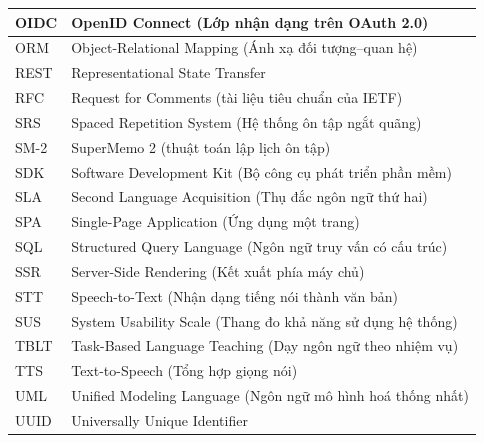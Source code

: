 \documentclass[12pt,a4paper,oneside]{report}
\begin{document}
\begin{table}[h]
\begin{tabular}{|l|l|}
    \hline
    OIDC  & OpenID Connect (Lớp nhận dạng trên OAuth 2.0) \\
    \hline
    ORM   & Object-Relational Mapping (Ánh xạ đối tượng--quan hệ) \\
    \hline
    REST  & Representational State Transfer \\
    \hline
    RFC   & Request for Comments (tài liệu tiêu chuẩn của IETF) \\
    \hline
    SRS   & Spaced Repetition System (Hệ thống ôn tập ngắt quãng) \\
    \hline
    SM-2  & SuperMemo 2 (thuật toán lập lịch ôn tập) \\
    \hline
    SDK   & Software Development Kit (Bộ công cụ phát triển phần mềm) \\
    \hline
    SLA   & Second Language Acquisition (Thụ đắc ngôn ngữ thứ hai) \\
    \hline
    SPA   & Single-Page Application (Ứng dụng một trang) \\
    \hline
    SQL   & Structured Query Language (Ngôn ngữ truy vấn có cấu trúc) \\
    \hline
    SSR   & Server-Side Rendering (Kết xuất phía máy chủ) \\
    \hline
    STT   & Speech-to-Text (Nhận dạng tiếng nói thành văn bản) \\
    \hline
    SUS   & System Usability Scale (Thang đo khả năng sử dụng hệ thống) \\
    \hline
    TBLT  & Task-Based Language Teaching (Dạy ngôn ngữ theo nhiệm vụ) \\
    \hline
    TTS   & Text-to-Speech (Tổng hợp giọng nói) \\
    \hline
    UML   & Unified Modeling Language (Ngôn ngữ mô hình hoá thống nhất) \\
    \hline
    UUID  & Universally Unique Identifier \\
    \hline
  \end{tabular}
\end{table}

\clearpage
{}




\end{document}
